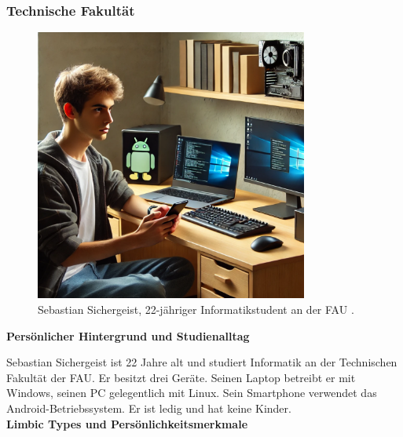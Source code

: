 \documentclass[german,report]{i1thesis}
\begin{document}
\newpage

\subsubsection{Technische Fakultät}

\begin{figure}[H]
    \centering
    \includegraphics[width=0.8\textwidth]{images/sebastian_mueller.pdf}
    \caption{Sebastian Sichergeist, 22-jähriger Informatikstudent an der FAU \cite{chatgpt2024sebastianmueller}.}
    \label{fig:sebastian_mueller}
\end{figure}

\textbf{Persönlicher Hintergrund und Studienalltag}

Sebastian Sichergeist ist 22 Jahre alt und studiert Informatik an der Technischen Fakultät der FAU. Er besitzt drei Geräte. Seinen Laptop betreibt er mit Windows, seinen PC gelegentlich mit Linux. Sein Smartphone verwendet das Android-Betriebssystem. Er ist ledig und hat keine Kinder.\\

\textbf{Limbic Types und Persönlichkeitsmerkmale}
\end{document}
